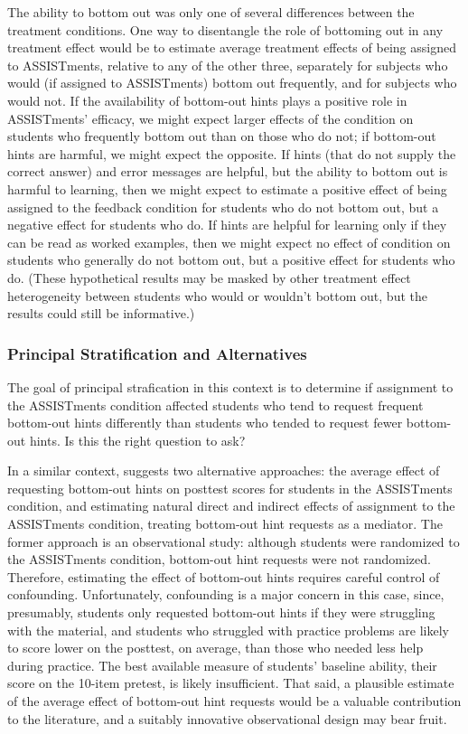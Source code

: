 \documentclass[]{article}
\begin{document}
The ability to bottom out was only one of several differences between the treatment conditions. One way to disentangle the role of bottoming out in any treatment effect would be to estimate average treatment effects of being assigned to ASSISTments, relative to any of the other three, separately for subjects who would (if assigned to ASSISTments) bottom out frequently, and for subjects who would not.
If the availability of bottom-out hints plays a positive role in ASSISTments' efficacy, we might expect larger effects of the condition on students who frequently bottom out than on those who do not; if bottom-out hints are harmful, we might expect the opposite.
If hints (that do not supply the correct answer) and error messages are helpful, but the ability to bottom out is harmful to learning, then we might expect to estimate a positive effect of being assigned to the feedback condition for students who do not bottom out, but a negative effect for students who do. If hints are helpful for learning only if they can be read as worked examples, then we might expect no effect of condition on students who generally do not bottom out, but a positive effect for students who do.
(These hypothetical results may be masked by other treatment effect heterogeneity between students who would or wouldn't bottom out, but the results could still be informative.)

\subsubsection{Principal Stratification and Alternatives}
The goal of principal strafication in this context is to determine if assignment to the ASSISTments condition affected students who tend to request frequent bottom-out hints differently than students who tended to request fewer bottom-out hints.
Is this the right question to ask?

In a similar context, \citet{sales2021student} suggests two alternative approaches: the average effect of requesting bottom-out hints on posttest scores for students in the ASSISTments condition, and estimating natural direct and indirect effects of assignment to the ASSISTments condition, treating bottom-out hint requests as a mediator.
The former approach is an observational study: although students were randomized to the ASSISTments condition, bottom-out hint requests were not randomized. Therefore, estimating the effect of bottom-out hints requires careful control of confounding.
Unfortunately, confounding is a major concern in this case, since, presumably, students only requested bottom-out hints if they were struggling with the material, and students who struggled with practice problems are likely to score lower on the posttest, on average, than those who needed less help during practice.
The best available measure of students' baseline ability, their score on the 10-item pretest, is likely insufficient.
That said, a plausible estimate of the average effect of bottom-out hint requests would be a valuable contribution to the literature, and a suitably innovative observational design \citep[e.g.][]{beck} may bear fruit.
\end{document}
